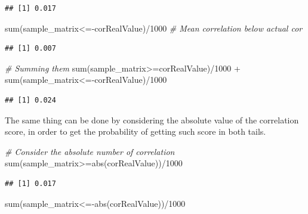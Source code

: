 \documentclass[
  notitlepage,
  onecolumn,
  openany]{book}
\newenvironment{Shaded}{\begin{snugshade}}{\end{snugshade}}
\newcommand{\CommentTok}[1]{\textcolor[rgb]{0.56,0.35,0.01}{\textit{#1}}}
\newcommand{\DecValTok}[1]{\textcolor[rgb]{0.00,0.00,0.81}{#1}}
\newcommand{\FunctionTok}[1]{\textcolor[rgb]{0.00,0.00,0.00}{#1}}
\newcommand{\NormalTok}[1]{#1}
\newcommand{\SpecialCharTok}[1]{\textcolor[rgb]{0.00,0.00,0.00}{#1}}
\begin{document}
\begin{verbatim}
## [1] 0.017
\end{verbatim}

\begin{Shaded}
\begin{Highlighting}[]
\FunctionTok{sum}\NormalTok{(sample\_matrix}\SpecialCharTok{\textless{}={-}}\NormalTok{corRealValue)}\SpecialCharTok{/}\DecValTok{1000} \CommentTok{\# Mean correlation below actual cor}
\end{Highlighting}
\end{Shaded}

\begin{verbatim}
## [1] 0.007
\end{verbatim}

\begin{Shaded}
\begin{Highlighting}[]
\CommentTok{\# Summing them}
\FunctionTok{sum}\NormalTok{(sample\_matrix}\SpecialCharTok{\textgreater{}=}\NormalTok{corRealValue)}\SpecialCharTok{/}\DecValTok{1000} \SpecialCharTok{+} \FunctionTok{sum}\NormalTok{(sample\_matrix}\SpecialCharTok{\textless{}={-}}\NormalTok{corRealValue)}\SpecialCharTok{/}\DecValTok{1000}
\end{Highlighting}
\end{Shaded}

\begin{verbatim}
## [1] 0.024
\end{verbatim}

The same thing can be done by considering the absolute value of the correlation score, in order to get the probability of getting such score in both tails.

\begin{Shaded}
\begin{Highlighting}[]
\CommentTok{\# Consider the absolute number of correlation}
\FunctionTok{sum}\NormalTok{(sample\_matrix}\SpecialCharTok{\textgreater{}=}\FunctionTok{abs}\NormalTok{(corRealValue))}\SpecialCharTok{/}\DecValTok{1000}
\end{Highlighting}
\end{Shaded}

\begin{verbatim}
## [1] 0.017
\end{verbatim}

\begin{Shaded}
\begin{Highlighting}[]
\FunctionTok{sum}\NormalTok{(sample\_matrix}\SpecialCharTok{\textless{}={-}}\FunctionTok{abs}\NormalTok{(corRealValue))}\SpecialCharTok{/}\DecValTok{1000}
\end{Highlighting}
\end{Shaded}
\end{document}
